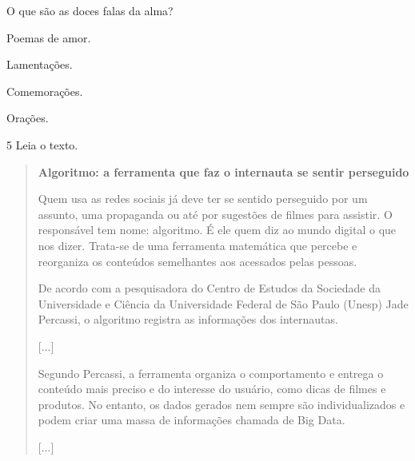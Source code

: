 O que são as doces falas da alma?

\begin{escolha}
\item Poemas de amor.

\item Lamentações.

\item Comemorações.

\item Orações.
\end{escolha}


\num{5} Leia o texto.

\begin{quote}
\textbf{Algoritmo: a ferramenta que faz o internauta se sentir perseguido}

Quem usa as redes sociais já deve ter se sentido perseguido por um assunto, uma propaganda ou até por sugestões de filmes para assistir. O responsável tem nome: algoritmo. É ele quem diz ao mundo digital o que nos dizer. Trata-se de uma ferramenta matemática que percebe e reorganiza os conteúdos semelhantes aos acessados pelas pessoas.

De acordo com a pesquisadora do Centro de Estudos da Sociedade da Universidade e Ciência da Universidade Federal de São Paulo (Unesp) Jade Percassi, o algoritmo registra as informações dos internautas.

{[}...{]}

Segundo Percassi, a ferramenta organiza o comportamento e entrega o conteúdo mais preciso e do interesse do usuário, como dicas de filmes e produtos. No entanto, os dados gerados nem sempre são individualizados e podem criar uma massa de informações chamada de Big Data.

{[}...{]}

\end{quote}


